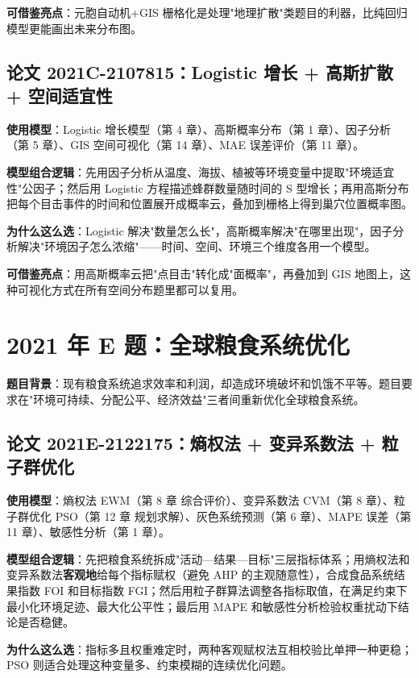 \textbf{可借鉴亮点}：元胞自动机+GIS 栅格化是处理"地理扩散"类题目的利器，比纯回归模型更能画出未来分布图。

\subsection{论文 2021C-2107815：Logistic 增长 + 高斯扩散 + 空间适宜性}
\textbf{使用模型}：Logistic 增长模型（第 4 章）、高斯概率分布（第 1 章）、因子分析（第 5 章）、GIS 空间可视化（第 14 章）、MAE 误差评价（第 11 章）。

\textbf{模型组合逻辑}：先用因子分析从温度、海拔、植被等环境变量中提取"环境适宜性"公因子；然后用 Logistic 方程描述蜂群数量随时间的 S 型增长；再用高斯分布把每个目击事件的时间和位置展开成概率云，叠加到栅格上得到巢穴位置概率图。

\textbf{为什么这么选}：Logistic 解决"数量怎么长"，高斯概率解决"在哪里出现"，因子分析解决"环境因子怎么浓缩"——时间、空间、环境三个维度各用一个模型。

\textbf{可借鉴亮点}：用高斯概率云把"点目击"转化成"面概率"，再叠加到 GIS 地图上，这种可视化方式在所有空间分布题里都可以复用。

\section{2021 年 E 题：全球粮食系统优化}

\textbf{题目背景}：现有粮食系统追求效率和利润，却造成环境破坏和饥饿不平等。题目要求在"环境可持续、分配公平、经济效益"三者间重新优化全球粮食系统。

\subsection{论文 2021E-2122175：熵权法 + 变异系数法 + 粒子群优化}
\textbf{使用模型}：熵权法 EWM（第 8 章 综合评价）、变异系数法 CVM（第 8 章）、粒子群优化 PSO（第 12 章 规划求解）、灰色系统预测（第 6 章）、MAPE 误差（第 11 章）、敏感性分析（第 1 章）。

\textbf{模型组合逻辑}：先把粮食系统拆成"活动—结果—目标"三层指标体系；用熵权法和变异系数法\textbf{客观地}给每个指标赋权（避免 AHP 的主观随意性），合成食品系统结果指数 FOI 和目标指数 FGI；然后用粒子群算法调整各指标取值，在满足约束下最小化环境足迹、最大化公平性；最后用 MAPE 和敏感性分析检验权重扰动下结论是否稳健。

\textbf{为什么这么选}：指标多且权重难定时，两种客观赋权法互相校验比单押一种更稳；PSO 则适合处理这种变量多、约束模糊的连续优化问题。

